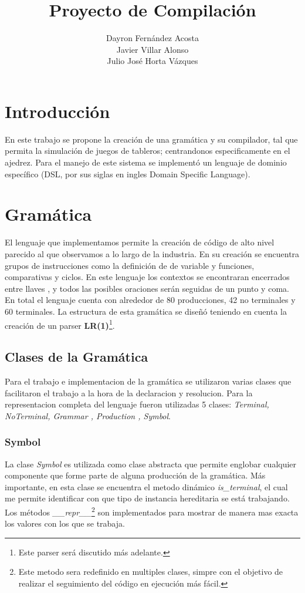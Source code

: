 \documentclass[10pt,a4paper]{article}
\author{Dayron Fernández Acosta\\ Javier Villar Alonso \\ Julio José Horta Vázques}
\title{Proyecto de Compilación}
\begin{document}
\maketitle
\newpage
\makeindex
\section{Introducción}
En este trabajo se propone la creación de una gramática y su compilador, tal que permita la simulación de juegos de tableros; centrandonos especificamente en el ajedrez. Para el manejo de este sistema se implementó un lenguaje de dominio específico (DSL, por sus siglas en ingles Domain Specific Language).

\section{Gramática}
El lenguaje que implementamos permite la creación de código de alto nivel parecido al que observamos a lo largo de la industria. En su creación se encuentra grupos de instrucciones como la definición de de variable y funciones, comparativas y ciclos. En este lenguaje los contextos se encontraran encerrados entre llaves , y todos las posibles oraciones serán seguidas de un punto y coma. En total el lenguaje cuenta con alrededor de 80 producciones, 42 no terminales y 60 terminales. La estructura de esta gramática se diseñó teniendo en cuenta la creación de un parser \textbf{LR(1)}\footnote{Este parser será discutido más adelante.}.
\subsection{Clases de la Gramática}
Para el trabajo e implementacion de la gramática se utilizaron varias clases que facilitaron el trabajo a la hora de la declaracion y resolucion. Para la representacion completa del lenguaje fueron utilizadas 5 clases: \textit{Terminal, NoTerminal, Grammar , Production , Symbol}.

\subsubsection{Symbol}
La clase \textit{Symbol} es utilizada como clase abstracta que permite englobar cualquier componente que forme parte de alguna producción de la gramática. Más importante, en esta clase se encuentra el metodo dinámico \textit{is\_terminal}, el cual me permite identificar con que tipo de instancia hereditaria se está trabajando. Los métodos \textit{\_\_repr\_\_}\footnote{Este metodo sera redefinido en multiples clases, simpre con el objetivo de realizar el seguimiento del código en ejecución más fácil.} son implementados para mostrar de manera mas exacta los valores con los que se trabaja.
\end{document}
